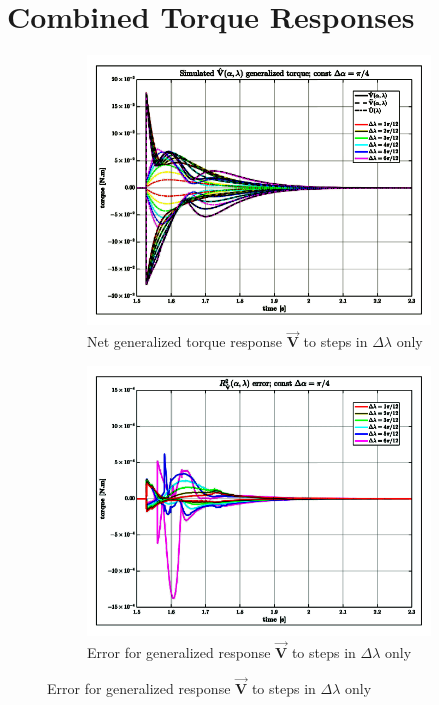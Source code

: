 \section{Combined Torque Responses}
\label{app:tau-comb}
\begin{figure}[htbp]
\centering
\begin{subfigure}{0.49\textwidth}
\centering
\includegraphics[width=\textwidth]{graphs/tau-comb-lam}
\caption{Net generalized torque response $\vec{\mathbf{V}}$ to steps in $\Delta\lambda$ only}
\end{subfigure}
\begin{subfigure}{0.49\textwidth}
\centering
\includegraphics[width=\textwidth]{graphs/tau-comb-lam-r}
\caption{Error for generalized response $\vec{\mathbf{V}}$ to steps in $\Delta\lambda$ only}
\end{subfigure}
\end{figure}
